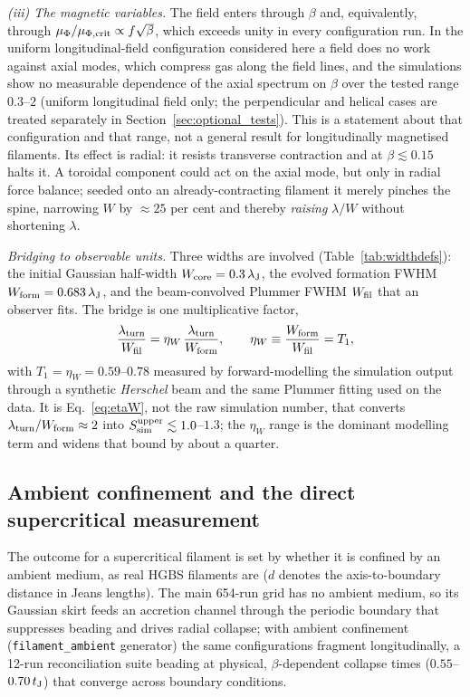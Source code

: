 \documentclass[usenatbib,twoside,twocolumn]{mnras}
\begin{document}
\emph{(iii) The magnetic variables.} The field enters through $\beta$ and, equivalently, through $\mu_\Phi/\mu_{\Phi,\rm crit}\propto f\sqrt{\beta}$, which exceeds unity in every configuration run. In the uniform longitudinal-field configuration considered here a field does no work against axial modes, which compress gas along the field lines, and the simulations show no measurable dependence of the axial spectrum on $\beta$ over the tested range $0.3$--$2$ (uniform longitudinal field only; the perpendicular and helical cases are treated separately in Section~\ref{sec:optional_tests}). This is a statement about that configuration and that range, not a general result for longitudinally magnetised filaments. Its effect is radial: it resists transverse contraction and at $\beta\lesssim0.15$ halts it. A toroidal component could act on the axial mode, but only in radial force balance; seeded onto an already-contracting filament it merely pinches the spine, narrowing $W$ by $\approx25$ per cent and thereby \emph{raising} $\lambda/W$ without shortening $\lambda$.

\emph{Bridging to observable units.} Three widths are involved (Table~\ref{tab:widthdefs}): the initial Gaussian half-width $W_{\rm core}=0.3\,\lambda_{\rm J}$, the evolved formation FWHM $W_{\rm form}=0.683\,\lambda_{\rm J}$, and the beam-convolved Plummer FWHM $W_{\rm fil}$ that an observer fits. The bridge is one multiplicative factor,
\begin{equation}
\frac{\lambda_{\rm turn}}{W_{\rm fil}}=\eta_W\,\frac{\lambda_{\rm turn}}{W_{\rm form}},
\qquad \eta_W\equiv\frac{W_{\rm form}}{W_{\rm fil}}=T_1,
\label{eq:etaW}
\end{equation}
with $T_1=\eta_W=0.59$--$0.78$ measured by forward-modelling the simulation output through a synthetic \textit{Herschel} beam and the same Plummer fitting used on the data. It is Eq.~\ref{eq:etaW}, not the raw simulation number, that converts $\lambda_{\rm turn}/W_{\rm form}\approx2$ into $S_{\rm sim}^{\rm upper}\lesssim1.0$--$1.3$; the $\eta_W$ range is the dominant modelling term and widens that bound by about a quarter.



\subsection{Ambient confinement and the direct supercritical measurement}
\label{sec:modecompetition}

The outcome for a supercritical filament is set by whether it is confined by an ambient medium, as real HGBS filaments are ($d$ denotes the axis-to-boundary distance in Jeans lengths). The main 654-run grid has no ambient medium, so its Gaussian skirt feeds an accretion channel through the periodic boundary that suppresses beading and drives radial collapse; with ambient confinement (\texttt{filament\_ambient} generator) the same configurations fragment longitudinally, a 12-run reconciliation suite beading at physical, $\beta$-dependent collapse times ($0.55$--$0.70\,t_{\rm J}$) that converge across boundary conditions.
\end{document}
